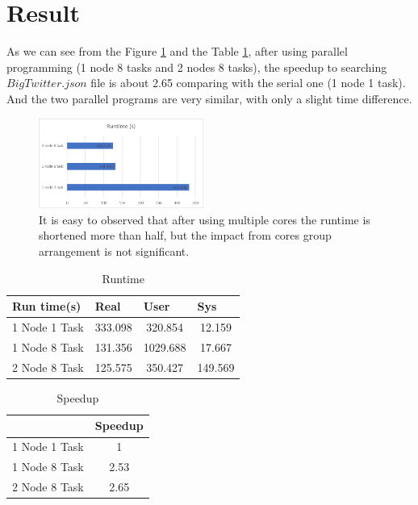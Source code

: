 \documentclass[11pt]{article}
\begin{document}
\section{Result}

As we can see from the Figure \ref{fig:Runtime Bar Chart} and the Table \ref{tab:Runtime Data}, after using parallel programming (1 node 8 tasks and 2 nodes 8 tasks), the speedup to searching $BigTwitter.json$ file is about 2.65 comparing with the serial one (1 node 1 task). And the two parallel programs are very similar, with only a slight time difference.

\begin{figure}[h]
\includegraphics[width=0.48\textwidth]{runtimeChart2.png}
\caption{It is easy to observed that after using multiple cores the runtime is shortened more than half, but the impact from cores group arrangement is not significant.}
\label{fig:Runtime Bar Chart}
\end{figure}

\begin{table}[]
\begin{tabular}{c|ccc}
\multicolumn{1}{l|}{Run time(s)} & \multicolumn{1}{l}{Real} & \multicolumn{1}{l}{User} & \multicolumn{1}{l}{Sys} \\ \hline
1 Node 1 Task                   & 333.098                  & 320.854                  & 12.159                  \\ \hline
1 Node 8 Task                   & 131.356                  & 1029.688                & 17.667                  \\ \hline
2 Node 8 Task                   & 125.575                  & 350.427                  & 149.569
\end{tabular}
\caption{Runtime}
\label{tab:Runtime Data}
\end{table}

\begin{table}[]
\centering
\begin{tabular}{c|c}
\multicolumn{1}{l|}{} & \multicolumn{1}{l}{Speedup} \\ \hline
1 Node 1 Task         & 1                           \\ \hline
1 Node 8 Task         & 2.53                      \\ \hline
2 Node 8 Task         & 2.65                       
\end{tabular}
\caption{Speedup}
\label{tab:Speedup}
\end{table}
\end{document}
